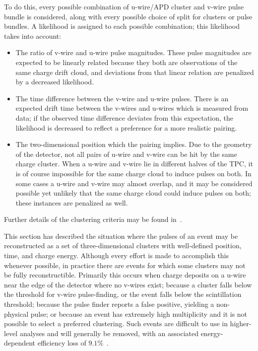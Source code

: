 To do this, every possible combination of u-wire/APD cluster and v-wire pulse bundle is considered, along with every possible choice of split for clusters or pulse bundles.  A likelihood is assigned to each possible combination; this likelihood takes into account:
\begin{itemize}
\item The ratio of v-wire and u-wire pulse magnitudes.  These pulse magnitudes are expected to be linearly related because they both are observations of the same charge drift cloud, and deviations from that linear relation are penalized by a decreased likelihood.
\item The time difference between the v-wire and u-wire pulses.  There is an expected drift time between the v-wires and u-wires which is measured from data; if the observed time difference deviates from this expectation, the likelihood is decreased to reflect a preference for a more realistic pairing.
\item The two-dimensional position which the pairing implies.  Due to the geometry of the detector, not all pairs of u-wire and v-wire can be hit by the same charge cluster.  When a u-wire and v-wire lie in different halves of the TPC, it is of course impossible for the same charge cloud to induce pulses on both.  In some cases a u-wire and v-wire may almost overlap, and it may be considered possible yet unlikely that the same charge cloud could induce pulses on both; these instances are penalized as well.
\end{itemize}
Further details of the clustering criteria may be found in~\cite{ReconstructionDocument}.

This section has described the situation where the pulses of an event may be reconstructed as a set of three-dimensional clusters with well-defined position, time, and charge energy.  Although every effort is made to accomplish this whenever possible, in practice there are events for which some clusters may not be fully reconstructible.  Primarily this occurs when charge deposits on a u-wire near the edge of the detector where no v-wires exist; because a cluster falls below the threshold for v-wire pulse-finding, or the event falls below the scintillation threshold; because the pulse finder reports a false positive, yielding a non-physical pulse; or because an event has extremely high multiplicity and it is not possible to select a preferred clustering.  Such events are difficult to use in higher-level analyses and will generally be removed, with an associated energy-dependent efficiency loss of $9.1\%$~\cite{NewEXObb0nPaper_2014}.

